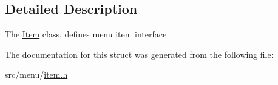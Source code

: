 \subsection{Detailed Description}
The \hyperlink{structItem}{Item} class, defines menu item interface 

The documentation for this struct was generated from the following file\+:\begin{DoxyCompactItemize}
\item 
src/menu/\hyperlink{item_8h}{item.\+h}\end{DoxyCompactItemize}
